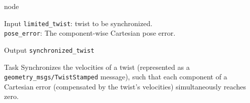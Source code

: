 \begin{frame}{ node}
\begin{alertblock}{Input}
\texttt{limited\_twist}: twist to be synchronized.\\
\texttt{pose\_error}: The component-wise Cartesian pose error.
\end{alertblock}

\begin{alertblock}{Output}
\texttt{synchronized\_twist}
\end{alertblock}

\begin{alertblock}{Task}
Synchronizes the velocities of a twist (represented as a \texttt{geometry\_msgs/TwistStamped} message), such that each component of a Cartesian error (compensated by the twist's velocities) simultaneously reaches zero.
\end{alertblock}
\end{frame}

